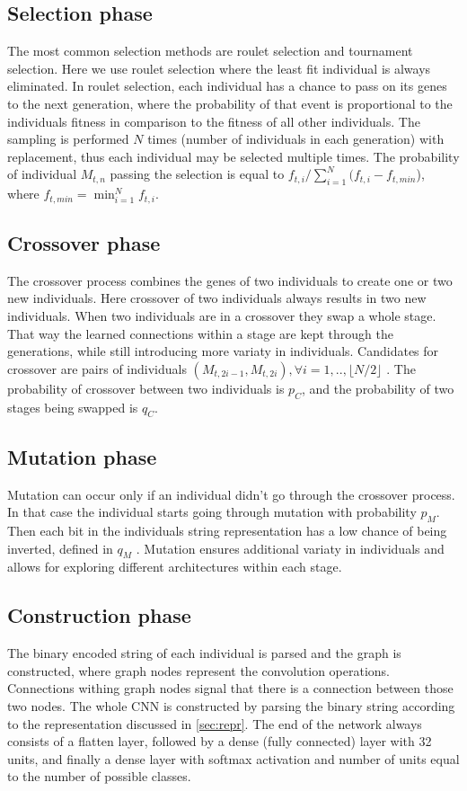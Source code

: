 \documentclass[eng]{simposium}
\begin{document}
\subsection{Selection phase}
The most common selection methods are roulet selection and tournament selection. 
Here we use roulet selection where the least fit individual is always eliminated.
In roulet selection, each individual has a chance to pass on its genes to the next generation, 
where the probability of that event is proportional to the individuals fitness in comparison to the fitness of all other individuals.
The sampling is performed $N$ times (number of individuals in each generation) with replacement, thus each individual may be selected multiple times.
The probability of individual $M_{t,n}$ passing the selection is equal to $f_{t,i} / \sum_{i=1}^{N} (f_{t,i} - f_{t,min}$), where $f_{t, min} = \min_{i=1}^{N} {f_{t,i}}$.

\subsection{Crossover phase}
The crossover process combines the genes of two individuals to create one or two new individuals.
Here crossover of two individuals always results in two new individuals.
When two individuals are in a crossover they swap a whole stage.
That way the learned connections within a stage are kept through the generations, while still introducing more variaty in individuals.
Candidates for crossover are pairs of individuals $(M_{t,2i-1}, M_{t,2i}), \forall i=1,..,\lfloor N/2\rfloor $ \cite{4}.
The probability of crossover between two individuals is $p_C$, and the probability of two stages being swapped is $q_C$.

\subsection{Mutation phase}
Mutation can occur only if an individual didn't go through the crossover process.
In that case the individual starts going through mutation with probability $p_M$.
Then each bit in the individuals string representation has a low chance of being inverted, defined in $q_M$ \cite{4}.
Mutation ensures additional variaty in individuals and allows for exploring different architectures within each stage.

\subsection{Construction phase}
The binary encoded  string of each individual is parsed and the graph is constructed, where graph nodes represent the convolution operations.
Connections withing graph nodes signal that there is a connection between those two nodes.
The whole CNN is constructed by parsing the binary string according to the representation discussed in \ref{sec:repr}. 
The end of the network always consists of a flatten layer, followed by a dense (fully connected) layer with 32 units, and finally a dense 
layer with softmax activation and number of units equal to the number of possible classes.
\end{document}
